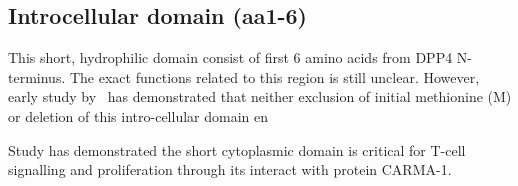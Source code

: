 \subsection{Introcellular domain (aa1-6)}

This short, hydrophilic domain consist of first 6 amino acids from DPP4 N-terminus. The exact functions related to this region is still unclear. However, early study by~\citet{Hong1990} has demonstrated that neither exclusion of initial methionine (M) or deletion of this intro-cellular domain en

Study has demonstrated the short cytoplasmic domain is critical for T-cell signalling and proliferation through its interact with protein CARMA-1. \cite{Ohnuma_2007}